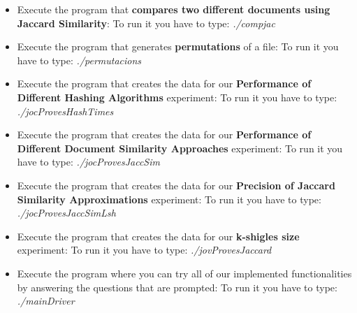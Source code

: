 \documentclass[12pt]{article}
\begin{document}
   \begin{itemize}
           \item Execute the program that \textbf{compares two different documents using Jaccard Similarity}:
   To run it you have to type: \textit{./compjac}
  

   \item Execute the program that generates \textbf{permutations} of a file:
   To run it you have to type: \textit{./permutacions}
    
\item Execute the program that creates the data for our \textbf{Performance of Different Hashing Algorithms} experiment:
   To run it you have to type: \textit{./jocProvesHashTimes}
  
\item Execute the program that creates the data for our \textbf{Performance of Different Document Similarity Approaches} experiment:
   To run it you have to type: \textit{./jocProvesJaccSim}
   \item Execute the program that creates the data for our \textbf{Precision of Jaccard Similarity Approximations} experiment:
   To run it you have to type: \textit{./jocProvesJaccSimLsh}
   
      \item Execute the program that creates the data for our \textbf{k-shigles size} experiment:
   To run it you have to type: \textit{./jovProvesJaccard}

   \item Execute the program where you can try all of our implemented functionalities by answering the questions that are prompted:
   To run it you have to type: \textit{./mainDriver}
      \end{itemize}
\end{document}
